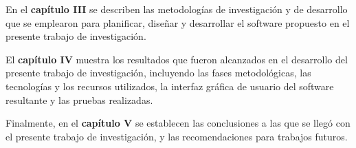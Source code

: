 	En el \textbf{cap\'{i}tulo III} se describen las metodolog\'{i}as de investigaci\'{o}n y de desarrollo que se emplearon para planificar, dise\~{n}ar y desarrollar el software propuesto en el presente trabajo de investigaci\'{o}n.

	El \textbf{cap\'{i}tulo IV} muestra los resultados que fueron alcanzados en el desarrollo del presente trabajo de investigaci\'{o}n, incluyendo las fases metodol\'{o}gicas, las tecnolog\'{i}as y los recursos utilizados, la interfaz gr\'{a}fica de usuario del software resultante y las pruebas realizadas.

	Finalmente, en el \textbf{cap\'{i}tulo V} se establecen las conclusiones a las que se lleg\'{o} con el presente trabajo de investigaci\'{o}n, y las recomendaciones para trabajos futuros.

	
	